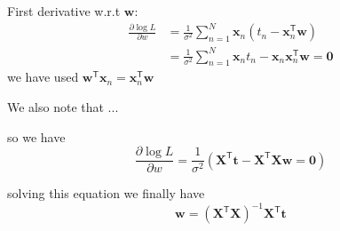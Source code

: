 \documentclass[a4paper,11pt]{article} %
\begin{document}
First derivative w.r.t $\mathbf{w}$:
\begin{align*}
\frac{\partial\log L}{\partial w} & = \frac{1}{\sigma^2}
\sum_{n=1}^{N} \mathbf{x}_{n} \left( t_{n} - \mathbf{x}^{\mathsf{T}}_{n} \mathbf{w} \right) \\
& = \frac{1}{\sigma^2}\sum_{n=1}^{N} \mathbf{x}_{n} t_{n} - 
\mathbf{x}_{n}\mathbf{x}_{n}^{\mathsf{T}}\mathbf{w}
= \mathbf{0}
\end{align*}
we have used
$\mathbf{w}^{\mathsf{T}}\mathbf{x}_{n} = \mathbf{x}_{n}^{\mathsf{T}}\mathbf{w}$

We also note that ...

so we have
\begin{equation}
\frac{\partial\log L}{\partial w} = \frac{1}{\sigma^2}\left(
\mathbf{X}^{\mathsf{T}}\mathbf{t} - \mathbf{X}^{\mathsf{T}}\mathbf{X}\mathbf{w} = \mathbf{0}
\right)
\end{equation}

solving this equation we finally have
\begin{equation}
\mathbf{w} = \left(\mathbf{X}^{\mathsf{T}}\mathbf{X}\right)^{-1}
\mathbf{X}^{\mathsf{T}}\mathbf{t}
\end{equation}



\end{document}
